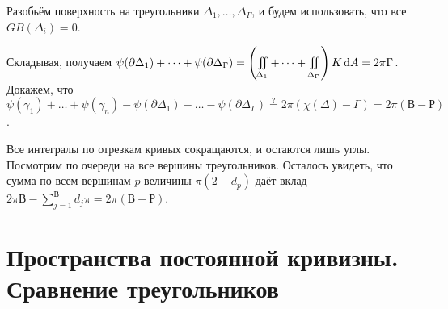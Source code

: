 \documentclass[a4paper]{report}
\begin{document}
{{    Разобьём поверхность на треугольники $\Delta_1, \dots, \Delta_\Gamma$, и будем использовать, что все $GB(\Delta_i) = 0$.

    Складывая, получаем $\psi(\partial \Delta_1) + \dots + \psi(\partial \Delta_\Gamma) = \left(\iint\limits_{\Delta_1} + \dots + \iint\limits_{\Delta_\Gamma}\right)K\operatorname{d}\! A = 2\pi \Gamma$.
    Докажем, что $\psi(\gamma_1) + \dots + \psi(\gamma_n) - \psi(\partial \Delta_1) - \dots - \psi(\partial \Delta_\Gamma) \overset{?}= 2\pi(\chi(\Delta) - \Gamma) = 2\pi(\text{В} - \text{Р})$.

    Все интегралы по отрезкам кривых сокращаются, и остаются лишь углы.
        Посмотрим по очереди на все вершины треугольников.
    Осталось увидеть, что сумма по всем вершинам $p$ величины $\pi(2 - d_p)$ даёт вклад $2\pi\text{В} - \sum\limits_{j = 1}^{\text{В}}d_j \pi = 2\pi(\text{В} - \text{Р})$.
    }
    }
    \section{Пространства постоянной кривизны. Сравнение треугольников}
\end{document}
